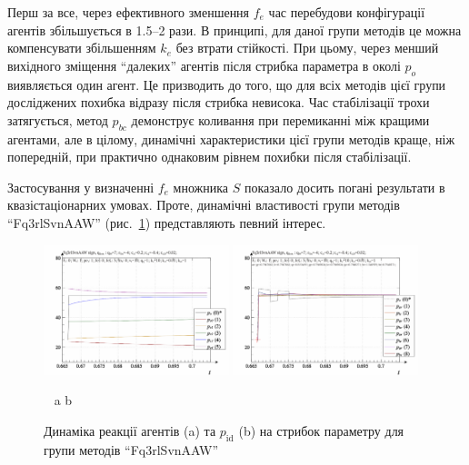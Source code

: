 Перш за все, через ефективного зменшення
$ f_e $ час перебудови конфігурації агентів збільшується в 1.5--2
рази. В принципі, для даної групи методів це можна компенсувати
збільшенням
$ k_e $ без втрати стійкості. При цьому, через менший вихідного
зміщення ``далеких'' агентів після стрибка параметра в околі
$ p_o $ виявляється один агент. Це призводить до того, що для всіх
методів цієї групи досліджених похибка відразу після стрибка
невисока. Час стабілізації трохи затягується, метод
$ p_{bc} $ демонструє коливання при перемиканні між кращими
агентами, але в цілому, динамічні характеристики цієї групи
методів краще, ніж попередній, при практично однаковим рівнем
похибки після стабілізації.

Застосування у визначенні
$ f_e $ множника
$ S $ показало досить погані результати в квазістаціонарних
умовах. Проте, динамічні властивості групи методів ``Fq3rlSvnAAW''
(рис.~\ref{atu:f:Fq3rlSvnAAW_sign}) представляють певний інтерес.

\begin{figure}[htb!]
  \begin{center}
    \includegraphics[width=0.48\textwidth]{p/sign/qls-p_t_pi_m_Fq3rlSvnAAW_sign.png}
    \hfill
    \includegraphics[width=0.48\textwidth]{p/sign/qls-p_t_p_m_Fq3rlSvnAAW_sign.png}
  \end{center}
  \vspace{-1.0ex}
  \begin{center}
    ~ \hfill a \hfill\hfill b  \hfill ~
  \end{center}
  \vspace{-1.5ex}
  \caption{Динаміка реакції агентів (a) та $p_\mathrm{id}$ (b) на стрибок параметру для групи методів ``Fq3rlSvnAAW''}
  \label{atu:f:Fq3rlSvnAAW_sign}
\end{figure}

